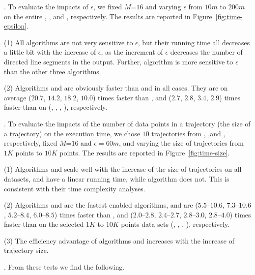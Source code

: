 .
To evaluate the impacts of $\epsilon$, we fixed $M$=$16$ and varying $\epsilon$  from $10m$ to $200m$ on the entire \truck, \sercar, \geolife and \pricar, respectively.
The results are reported in Figure~\ref{fig:time-epsilon}.

\ni(1) All algorithms are not very sensitive to $\epsilon$, but their running time all decreases a little bit with the increase of $\epsilon$, as the increment of $\epsilon$ decreases the number of directed line segments in the output.
Further, algorithm \dps is more sensitive to $\epsilon$ than the other three algorithms.

\ni(2) Algorithms \cist and \cista are obviously faster than \dps and \squishe in all cases.
They are on average ($20.7$, $14.2$, $18.2$, $10.0$) times faster than \dps, and ($2.7$, $2.8$, $3.4$, {$2.9$}) times faster than \squishe on (\truck, \sercar, {\geolife}, \pricar), respectively.


.
To evaluate the impacts of the number of data points in a trajectory (\ie the size of a trajectory) on the execution time,
we chose {$10$} trajectories from \truck, \sercar,\geolife and \pricar, respectively,
fixed $M$=$16$ and $\epsilon = 60m$, and varying the size  of trajectories from $1K$ points to $10K$ points.
%
The results are reported in Figure~\ref{fig:time-size}.

\ni(1) Algorithms \cist and \cista scale well with the increase of the size of trajectories on all datasets,
and have a linear running time, while algorithm \dps does not.
This is consistent with their time complexity analyses.

\ni(2) Algorithms \cist and \cista are the fastest \sed enabled \lsa algorithms, and are {($5.5$--$10.6$, $7.3$--$10.6$, $5.2$--$8.4$, $6.0$--$8.5$)} times faster than \dps,
and {($2.0$--$2.8$, $2.4$--$2.7$, $2.8$--$3.0$, $2.8$--$4.0$)} times faster than \squishe on the selected $1K$ to $10K$ points data sets (\truck, \sercar, \geolife, \pricar), respectively.

\ni(3) The efficiency advantage of algorithms \cist and \cista increases with the increase of trajectory size.



.
From these tests we find the following.

